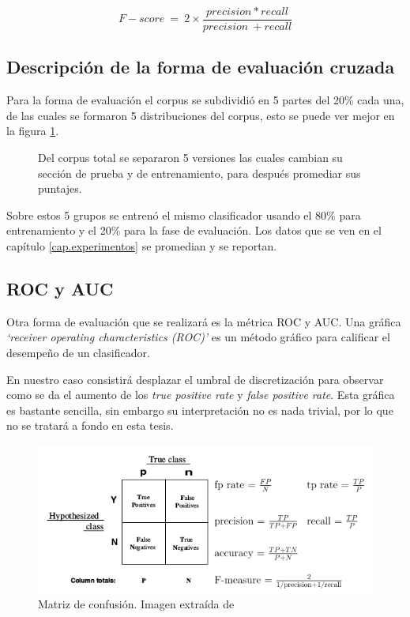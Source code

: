 	\begin{figure}[H]
    \centering
    \begin{equation*}
        F-score\ =\ 2 \times  \frac{precision*recall}{precision\ +recall}
    \end{equation*}
\end{figure}
	
\subsection{Descripción de la forma de evaluación cruzada}
		
\par Para la forma de evaluación el corpus se subdividió en 5 partes del 20\% cada una, de las cuales se formaron 5 distribuciones del corpus, esto se puede ver mejor en la figura \ref{fig:corpusDiv}. 

\begin{figure}
    \centering
    
    \caption{Del corpus total se separaron 5 versiones las cuales cambian su sección de prueba y de entrenamiento, para después promediar sus puntajes.}
    \label{fig:corpusDiv}
\end{figure}

\par Sobre estos 5 grupos se entrenó el mismo clasificador usando el 80\% para entrenamiento y el 20\% para la fase de evaluación. Los datos que se ven en el capítulo \ref{cap.experimentos} se promedian y se reportan. 

\subsection{ROC y AUC}

\par Otra forma de evaluación que se realizará es la métrica ROC y AUC. Una gráfica \textit{`receiver operating characteristics (ROC)'} es un método gráfico para calificar el desempeño de un clasificador. 
\par En nuestro caso consistirá desplazar el umbral de discretización para observar como se da el aumento de los \textit{true positive rate} y \textit{false positive rate}. Esta gráfica es bastante sencilla, sin embargo su interpretación no es nada trivial, por lo que no se tratará a fondo en esta tesis.  

\begin{figure}
    \centering
    \includegraphics[width=\linewidth]{imagenes/confusionMatrix.png}
    \caption{Matriz de confusión. Imagen extraída de \cite{fawcett2006introduction}}
    \label{fig:confMat}
\end{figure}

